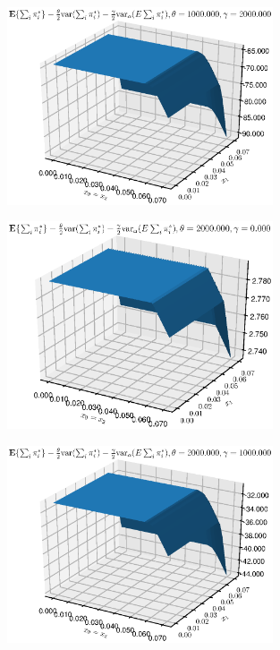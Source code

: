 \begin{figure}[htbp] %
   \centering
   \includegraphics[width=0.7\textwidth]{Figures/AToy/Atoy-FCP100000200000} 
\end{figure}

\begin{figure}[htbp] %
   \centering
   \includegraphics[width=0.7\textwidth]{Figures/AToy/Atoy-FCP200000000} 
\end{figure}


\begin{figure}[htbp] %
   \centering
   \includegraphics[width=0.7\textwidth]{Figures/AToy/Atoy-FCP200000100000} 
\end{figure}



